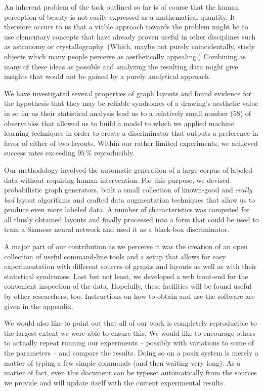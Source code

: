 \documentclass{graphstudy}
\begin{document}
An inherent problem of the task outlined so far is of course that the human perception of beauty is not easily expressed
as a mathematical quantity.  It therefore occurs to us that a viable approach towards the problem might be to use
elementary concepts that have already proven useful in other disciplines such as astronomy or crystallography.  (Which,
maybe not purely coincidentally, study objects which many people perceive as aesthetically appealing.)  Combining as
many of these ideas as possible and analyzing the resulting data might give insights that would not be gained by a
purely analytical approach.

We have investigated several properties of graph layouts and found evidence for the hypothesis that they may be reliable
syndromes of a drawing's aesthetic value in so far as their statistical analysis lead us to a relatively small number
(\(58\)) of observables that allowed us to build a model to which we applied machine learning techniques in order to
create a discriminator that outputs a preference in favor of either of two layouts.  Within our rather limited
experiments, we achieved success rates exceeding \(95\,\%\) reproducibly.

Our methodology involved the automatic generation of a large corpus of labeled data without requiring human
intervention.  For this purpose, we devised probabilistic graph generators, built a small collection of known-good and
\emph{really bad} layout algorithms and crafted data augmentation techniques that allow us to produce even more labeled
data.  A number of characteristics was computed for all thusly obtained layouts and finally processed into a form that
could be used to train a Siamese neural network and used it as a black-box discriminator.

A major part of our contribution as we perceive it was the creation of an open collection of useful command-line tools
and a setup that allows for easy experimentation with different sources of graphs and layouts as well as with their
statistical syndromes.  Last but not least, we developed a web front-end for the convenient inspection of the data.
Hopefully, these facilities will be found useful by other researchers, too.  Instructions on how to obtain and use the
software are given in the appendix.

We would also like to point out that all of our work is completely reproducible to the largest extent we were able to
ensure this.  We would like to encourage others to actually repeat running our experiments -- possibly with variations
to some of the parameters -- and compare the results.  Doing so on a \acs{posix} system is merely a matter of typing a
few simple commands (and then waiting very long).  As a matter of fact, even this document can be typeset automatically
from the sources we provide and will update itself with the current experimental results.
\end{document}
